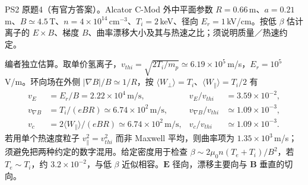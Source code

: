 \begin{exercise}\label{ex:hist02-2-4}
PS2 原题4（有官方答案）。Alcator C-Mod 外中平面参数 $R=0.66\,$m、$a=0.21\,$m、$B\simeq4.5\,$T、$n=4\times10^{14}\,\mathrm{cm^{-3}}$、$T_i=2\,$keV、径向 $E_r=1\,$kV/cm。按低 $\beta$ 估计离子的 $E\times B$、梯度 $B$、曲率漂移大小及其与热速之比；须说明质量／热速约定。
\end{exercise}
\begin{solution}
编者独立估算。取单价氢离子，$v_{thi}=\sqrt{2T_i/m_p}\simeq6.19\times10^5\,$m/s，$E_r=10^5\,$V/m。环向场在外侧 $|\nabla B|/B\simeq1/R$，按 $\langle W_\perp\rangle=T_i$、$\langle W_\parallel\rangle=T_i/2$ 有
\begin{align}
v_E&=E_r/B=2.22\times10^4\,\mathrm{m/s},&v_E/v_{thi}&=3.59\times10^{-2},\\
v_{\nabla B}&=T_i/(eBR)\simeq6.74\times10^2\,\mathrm{m/s},&v_{\nabla B}/v_{thi}&\simeq1.09\times10^{-3},\\
v_c&=2\langle W_\parallel\rangle/(eBR)\simeq6.74\times10^2\,\mathrm{m/s},&v_c/v_{thi}&\simeq1.09\times10^{-3}.
\end{align}
若用单个热速度粒子 $v_\parallel^2=v_{thi}^2$ 而非 Maxwell 平均，则曲率项为 $1.35\times10^3\,$m/s；须避免把两种约定的数字混用。给定密度用于检查 $\beta\sim2\mu_0n(T_e+T_i)/B^2$，若 $T_e\sim T_i$，约 $3.2\times10^{-2}$，与低 $\beta$ 近似相容。$\mathbf E$ 径向，漂移主要向与 $\mathbf B$ 垂直的切向。
\end{solution}
